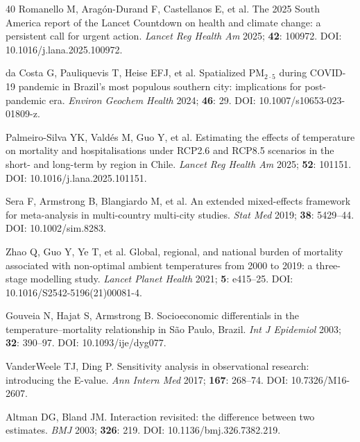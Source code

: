 \documentclass[review,number]{elsarticle}
\begin{document}
\begin{thebibliography}{40}
Romanello M, Arag\'{o}n-Durand F, Castellanos E, et al.
The 2025 South America report of the Lancet Countdown on health and climate change: a persistent call for urgent action.
\textit{Lancet Reg Health Am} 2025; \textbf{42}: 100972.
DOI: 10.1016/j.lana.2025.100972.

da Costa G, Pauliquevis T, Heise EFJ, et al.
Spatialized $\text{PM}_{2{\cdot}5}$ during COVID-19 pandemic in Brazil's most populous southern city: implications for post-pandemic era.
\textit{Environ Geochem Health} 2024; \textbf{46}: 29.
DOI: 10.1007/s10653-023-01809-z.

Palmeiro-Silva YK, Valdés M, Guo Y, et al.
Estimating the effects of temperature on mortality and hospitalisations under RCP2.6 and RCP8.5 scenarios in the short- and long-term by region in Chile.
\textit{Lancet Reg Health Am} 2025; \textbf{52}: 101151.
DOI: 10.1016/j.lana.2025.101151.

Sera F, Armstrong B, Blangiardo M, et al.
An extended mixed-effects framework for meta-analysis in multi-country multi-city studies.
\textit{Stat Med} 2019; \textbf{38}: 5429--44.
DOI: 10.1002/sim.8283.

Zhao Q, Guo Y, Ye T, et al.
Global, regional, and national burden of mortality associated with non-optimal ambient temperatures from 2000 to 2019: a three-stage modelling study.
\textit{Lancet Planet Health} 2021; \textbf{5}: e415--25.
DOI: 10.1016/S2542-5196(21)00081-4.

Gouveia N, Hajat S, Armstrong B.
Socioeconomic differentials in the temperature--mortality relationship in S\~{a}o Paulo, Brazil.
\textit{Int J Epidemiol} 2003; \textbf{32}: 390--97.
DOI: 10.1093/ije/dyg077.

VanderWeele TJ, Ding P.
Sensitivity analysis in observational research: introducing the E-value.
\textit{Ann Intern Med} 2017; \textbf{167}: 268--74.
DOI: 10.7326/M16-2607.

Altman DG, Bland JM.
Interaction revisited: the difference between two estimates.
\textit{BMJ} 2003; \textbf{326}: 219.
DOI: 10.1136/bmj.326.7382.219.

\end{thebibliography}
\end{document}
